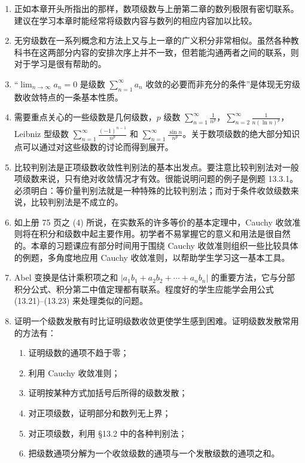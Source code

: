 \begin{enumerate}[label=\arabic*.]
\item 正如本章开头所指出的那样，数项级数与上册第二章的数列极限有密切联系。建议在学习本章时能经常将级数内容与数列的相应内容加以比较。
\item 无穷级数在一系列概念和方法上又与上一章的广义积分非常相似。虽然各种教科书在这两部分内容的安排次序上并不一致，但若能沟通两者之间的联系，则对于学习是很有帮助的。
\item “$\lim_{n\to\infty}a_n=0$ 是级数 $\sum_{n=1}^{\infty}a_n$ 收敛的必要而非充分的条件”是体现无穷级数收敛特点的一条基本性质。
\item 需要重点关心的一些级数是几何级数，$p$ 级数 $\sum_{n=1}^{\infty}\frac1{n^p}$，$\sum_{n=2}^{\infty}\frac1{n(\ln n)^p}$，Leibniz 型级数 $\sum_{n=1}^{\infty}\frac{(-1)^{n-1}}{n^p}$ 和 $\sum_{n=1}^{\infty}\frac{\sin n}{n^p}$。关于数项级数的绝大部分知识点可以通过对这些级数的讨论而得到展开。
\item 比较判别法是正项级数收敛性判别法的基本出发点。要注意比较判别法对一般项级数来说，只有绝对收敛情况才有效。很能说明问题的例子是例题 13.3.1。必须明白：等价量判别法就是一种特殊的比较判别法；而对于条件收敛级数来说，比较判别法是不成立的。
\item 如上册 75 页之 (4) 所说，在实数系的许多等价的基本定理中，Cauchy 收敛准则将在积分和级数中起主要作用。初学者不易掌握它的意义和用法是很自然的。本章的习题课应有部分时间用于围绕 Cauchy 收敛准则组织一些比较具体的例题，多角度地应用 Cauchy 收敛准则，以帮助学生学习这一基本工具。
\item Abel 变换是估计乘积项之和 $|a_1b_1+a_2b_2+\cdots+a_nb_n|$ 的重要方法，它与分部积分公式、积分第二中值定理都有联系。程度好的学生应能学会用公式 (13.21)--(13.23) 来处理类似的问题。
\item 证明一个级数发散有时比证明级数收敛更使学生感到困难。证明级数发散常用的方法有：
\begin{enumerate}[label=(\arabic*)]
\item 证明级数的通项不趋于零；
\item 利用 Cauchy 收敛准则；
\item 证明按某种方式加括号后所得的级数发散；
\item 对正项级数，证明部分和数列无上界；
\item 对正项级数，利用 §13.2 中的各种判别法；
\item 把级数通项分解为一个收敛级数的通项与一个发散级数的通项之和。
\end{enumerate}
\end{enumerate}

